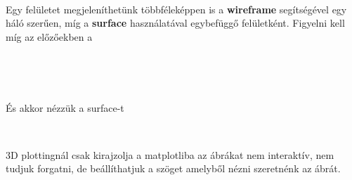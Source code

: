     \begin{center}
    \end{center}
    { \hspace*{\fill} \\}
    
    Egy felületet megjeleníthetünk többféleképpen is a \textbf{wireframe}
segítségével egy háló szerűen, míg a \textbf{surface} használatával
egybefüggő felületként. Figyelni kell míg az előzőekben a

\begin{python}

\end{python}

    \begin{center}
    \end{center}
    { \hspace*{\fill} \\}
    
\begin{python}

\end{python}

    \begin{center}
    \end{center}
    { \hspace*{\fill} \\}
    
    És akkor nézzük a surface-t

\begin{python}

\end{python}

    \begin{center}
    \end{center}
    { \hspace*{\fill} \\}
    
    3D plottingnál csak kirajzolja a matplotliba az ábrákat nem interaktív,
nem tudjuk forgatni, de beállíthatjuk a szöget amelyből nézni szeretnénk
az ábrát.

\begin{python}

\end{python}

